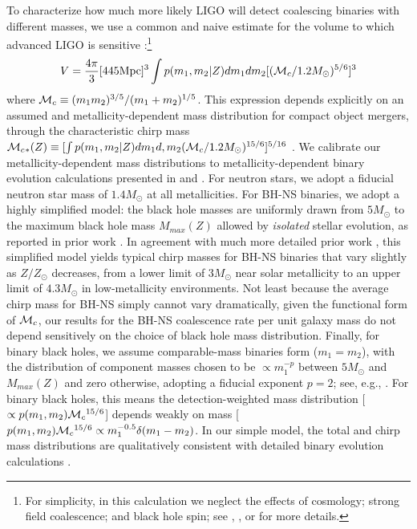 \documentclass[nofootinbib,twocolumn,prd]{emulateapj}
\newcommand\mc{{\cal M}_c{}}
\newcommand\unit[1]{\text{#1}}
\begin{document}
\begin{widetext}
To characterize how much more likely LIGO will detect coalescing binaries with different masses, we use a common and
naive estimate for the volume to which advanced LIGO is sensitive \citep[see,e.g.,][]{PSellipticals}:\footnote{For
  simplicity, in this calculation we neglect the effects of cosmology; strong field coalescence; and black hole spin;
  see \cite{popsyn-LowMetallicityImpact2c-StarTrackRevised-2014}, \cite{AstroPaper}, or \cite{RatesPaper} for more details.}
\begin{eqnarray}
V = \frac{4\pi}{3} [445 \unit{Mpc}]^3 \int p(m_1,m_2|Z) dm_1 dm_2 [ (\mc/1.2 M_\odot)^{5/6}]^3
\end{eqnarray}
where $\mc\equiv (m_1 m_2)^{3/5}/(m_1+m_2)^{1/5}$.   
This expression depends explicitly on an assumed and metallicity-dependent mass distribution for compact object
mergers, through the characteristic chirp mass $\mc_{*}(Z)\equiv [\int p(m_1,m_2|Z) dm_1 d,m_2 (\mc/1.2
  M_\odot)^{15/6}]^{5/16}$ .  We calibrate our metallicity-dependent mass distributions to metallicity-dependent binary
evolution calculations presented in \cite{popsyn-LowMetallicityImpact2-StarTrackRevised-2012} and
\cite{popsyn-LowMetallicityImpact2c-StarTrackRevised-2014}.  For neutron
stars, we adopt a fiducial neutron star mass of $1.4 M_\odot$ at all metallicities.  For BH-NS binaries, we adopt a
highly simplified model: the black hole masses are uniformly  drawn from $5 M_\odot$ to the maximum 
black hole mass $M_{max}(Z)$ allowed by
\emph{isolated} stellar evolution, as reported in prior work \citep[see,e.g.][and references
  therein]{gwastro-EventPopsynPaper-2016}.  In agreement with much more detailed prior work \cite{popsyn-LowMetallicityImpact2c-StarTrackRevised-2014}, this simplified model yields typical chirp masses for BH-NS binaries that
vary slightly as $Z/Z_\odot$ decreases, from a lower limit of $3 M_\odot$ near solar metallicity to an upper limit of
$4.3 M_\odot$ in low-metallicity environments.  Not least because the average chirp mass for BH-NS simply cannot vary
dramatically, given the functional form of $\mc$, our results for the BH-NS coalescence rate per unit galaxy mass do not depend sensitively on the choice of black hole mass
distribution.  Finally, for binary black holes, we assume  comparable-mass binaries
form ($m_1=m_2$), with the distribution of component masses chosen to be $\propto m_1^{-p}$ 
 between $5 M_\odot$ and $M_{max}(Z)$ and zero otherwise, adopting a fiducial exponent $p=2$; see, e.g.,
\cite{popsyn-LowMetallicityImpact2b-StarTrackRevised-2013}.    For binary black holes, this means  the
detection-weighted mass distribution [$\propto p(m_1,m_2)
\mc^{15/6}$] depends weakly on mass [$ p(m_1,m_2)
\mc^{15/6} \propto m_1^{-0.5} \delta(m_1-m_2)$.  In our simple model, the total  and chirp mass
distributions   are qualitatively consistent with detailed  binary evolution calculations \citep{popsyn-LowMetallicityImpact2b-StarTrackRevised-2013}. 

\end{widetext}
\end{document}
